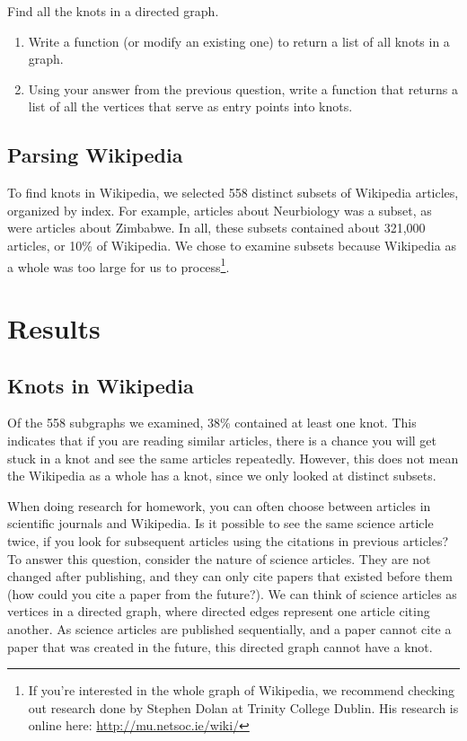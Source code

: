 \documentclass[10pt]{book}
\begin{document}
\begin{exercise}
 Find all the knots in a directed graph.
\begin{enumerate}
 \item Write a function (or modify an existing one) to return a list of all knots in a graph.
\item Using your answer from the previous question, write a function that returns a list of all the vertices that serve as entry points into knots.
\end{enumerate}

\end{exercise}
\subsection{Parsing Wikipedia}

To find knots in Wikipedia, we selected 558 distinct subsets of Wikipedia articles, organized by index. For example, articles about Neurbiology was a subset, as were articles about Zimbabwe. In all, these subsets contained about 321,000 articles, or 10\% of Wikipedia. We chose to examine subsets because Wikipedia as a whole was too large for us to process\footnote{If you’re interested in the whole graph of Wikipedia, we recommend checking out research done by Stephen Dolan at Trinity College Dublin. His research is online here: \url{http://mu.netsoc.ie/wiki/}}. 

\section{Results}
\subsection{Knots in Wikipedia}
Of the 558 subgraphs we examined, 38\% contained at least one knot. This indicates that if you are reading similar articles, there is a chance you will get stuck in a knot and see the same articles repeatedly. However, this does not mean the Wikipedia as a whole has a knot, since we only looked at distinct subsets.

When doing research for homework, you can often choose between articles in scientific journals and Wikipedia. Is it possible to see the same science article twice, if you look for subsequent articles using the citations in previous articles? To answer this question, consider the nature of science articles. They are not changed after publishing, and they can only cite papers that existed before them (how could you cite a paper from the future?). We can think of science articles as vertices in a directed graph, where directed edges represent one article citing another. As science articles are published sequentially, and a paper cannot cite a paper that was created in the future, this directed graph cannot have a knot. 
\end{document}
